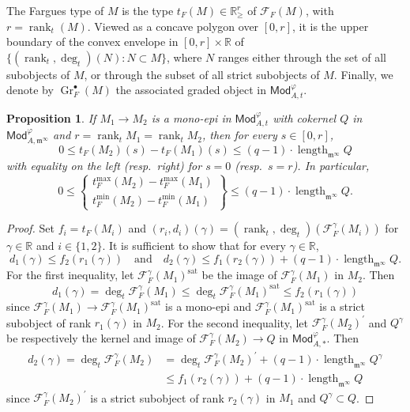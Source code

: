 \documentclass[11pt]{article}
\newtheorem{prop}[theo]{Proposition}
\theoremstyle{definition}
\numberwithin{equation}{section}
\numberwithin{figure}{section}
\numberwithin{table}{section}
\newcommand{\Mod}{\mathsf{Mod}}
\DeclareMathOperator{\length}{length}
\DeclareMathOperator{\rank}{rank}
\DeclareMathOperator{\Gr}{Gr}
\begin{document}
The Fargues type of $M$ is the type $t_{F}(M)\in\mathbb{R}_{\geq}^{r}$ of $\mathcal{F}_{F}(M)$, with $r=\rank_{t}(M)$. Viewed as a concave polygon over $[0,r]$, it is the upper boundary of the convex envelope in $[0,r]\times\mathbb{R}$ of $\{(\rank_{t},\deg_{t})(N):N\subset M\}$, where $N$ ranges either through the set of all subobjects of $M$, or through the subset of all strict subobjects of $M$. Finally, we denote by $\Gr_{F}^{\bullet}(M)$ the associated graded object in $\Mod_{A,t}^{\varphi}$.

\begin{prop}\label{prop:PseudoIsogInModt}
If $M_{1}\rightarrow M_{2}$ is a mono-epi in $\Mod_{A,t}^{\varphi}$ with cokernel $Q$ in $\Mod_{A,\mathfrak{m}^{\infty}}^{\varphi}$ and $r=\rank_{t}M_{1}=\rank_{t}M_{2}$, then for every $s\in[0,r]$,
\[
0\leq t_{F}(M_{2})(s)-t_{F}(M_{1})(s)\leq(q-1)\cdot\length_{\mathfrak{m}^{\infty}}Q
\]
with equality on the left (resp.~right) for $s=0$ (resp.~$s=r$). In particular,
\[
0\leq\left\{\!
\begin{array}{c}
t_{F}^{\max}(M_{2})-t_{F}^{\max}(M_{1})\\
t_{F}^{\min}(M_{2})-t_{F}^{\min}(M_{1})
\end{array}\!\right\} \leq(q-1)\cdot\length_{\mathfrak{m}^{\infty}}Q.
\]
\end{prop}

\begin{proof}
Set $f_{i}=t_{F}(M_{i})$ and $(r_{i},d_{i})(\gamma)=(\rank_{t},\deg_{t})(\mathcal{F}_{F}^{\gamma}(M_{i}))$ for $\gamma\in\mathbb{R}$ and $i\in\{1,2\}$. It is sufficient to show that for every $\gamma\in\mathbb{R}$,
\[
d_{1}(\gamma)\leq f_{2}(r_{1}(\gamma))\quad\text{and}\quad d_{2}(\gamma)\leq f_{1}(r_{2}(\gamma))+(q-1)\cdot\length_{\mathfrak{m}^{\infty}}Q.
\]
For the first inequality, let $\mathcal{F}_{F}^{\gamma}(M_{1})^{\mathrm{sat}}$ be the image of $\mathcal{F}_{F}^{\gamma}(M_{1})$ in $M_{2}$. Then
\[
d_{1}(\gamma)=\deg_{t}\mathcal{F}_{F}^{\gamma}(M_{1})\leq\deg_{t}\mathcal{F}_{F}^{\gamma}(M_{1})^{\mathrm{sat}}\leq f_{2}(r_{1}(\gamma))
\]
since $\mathcal{F}_{F}^{\gamma}(M_{1})\rightarrow\mathcal{F}_{F}^{\gamma}(M_{1})^{\mathrm{sat}}$ is a mono-epi and $\mathcal{F}_{F}^{\gamma}(M_{1})^{\mathrm{sat}}$ is a strict subobject of rank $r_{1}(\gamma)$ in $M_{2}$. For the second inequality, let $\mathcal{F}_{F}^{\gamma}(M_{2})^{\prime}$ and $Q^{\gamma}$ be respectively the kernel and image of $\mathcal{F}_{F}^{\gamma}(M_{2})\rightarrow Q$ in $\Mod_{A,\ast}^{\varphi}$. Then
\begin{align*}
d_{2}(\gamma)=\deg_{t}\mathcal{F}_{F}^{\gamma}(M_{2}) & = \deg_{t}\mathcal{F}_{F}^{\gamma}(M_{2})^{\prime}+(q-1)\cdot\length_{\mathfrak{m}^{\infty}}Q^{\gamma}\\
& \leq f_{1}(r_{2}(\gamma))+(q-1)\cdot\length_{\mathfrak{m}^{\infty}}Q
\end{align*}
since $\mathcal{F}_{F}^{\gamma}(M_{2})^{\prime}$ is a strict subobject of rank $r_{2}(\gamma)$ in $M_{1}$ and $Q^{\gamma}\subset Q$.
\end{proof}
\end{document}

